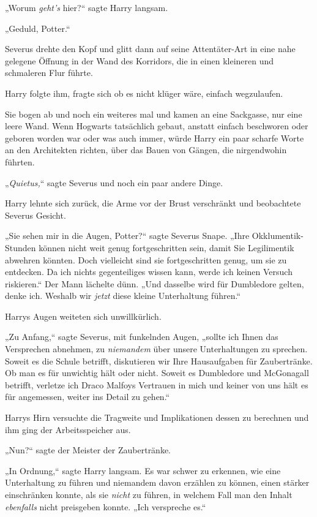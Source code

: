{„Worum \emph{geht's} hier?“ sagte Harry langsam.

„Geduld, Potter.“

Severus drehte den Kopf und glitt dann auf seine Attentäter-Art in eine nahe gelegene Öffnung in der Wand des Korridors, die in einen kleineren und schmaleren Flur führte.

Harry folgte ihm, fragte sich ob es nicht klüger wäre, einfach wegzulaufen.

Sie bogen ab und noch ein weiteres mal und kamen an eine Sackgasse, nur eine leere Wand. Wenn Hogwarts tatsächlich gebaut, anstatt einfach beschworen oder geboren worden war oder was auch immer, würde Harry ein paar scharfe Worte an den Architekten richten, über das Bauen von Gängen, die nirgendwohin führten.

„\emph{Quietus,}“ sagte Severus und noch ein paar andere Dinge.

Harry lehnte sich zurück, die Arme vor der Brust verschränkt und beobachtete Severus Gesicht.

„Sie sehen mir in die Augen, Potter?“ sagte Severus Snape. „Ihre Okklumentik-Stunden können nicht weit genug fortgeschritten sein, damit Sie Legilimentik abwehren könnten. Doch vielleicht sind sie fortgeschritten genug, um sie zu entdecken. Da ich nichts gegenteiliges wissen kann, werde ich keinen Versuch riskieren.“ Der Mann lächelte dünn. „Und dasselbe wird für Dumbledore gelten, denke ich. Weshalb wir \emph{jetzt} diese kleine Unterhaltung führen.“

Harrys Augen weiteten sich unwillkürlich.

„Zu Anfang,“ sagte Severus, mit funkelnden Augen, „sollte ich Ihnen das Versprechen abnehmen, zu \emph{niemandem} über unsere Unterhaltungen zu sprechen. Soweit es die Schule betrifft, diskutieren wir Ihre Hausaufgaben für Zaubertränke. Ob man es für unwichtig hält oder nicht. Soweit es Dumbledore und McGonagall betrifft, verletze ich Draco Malfoys Vertrauen in mich und keiner von uns hält es für angemessen, weiter ins Detail zu gehen.“

Harrys Hirn versuchte die Tragweite und Implikationen dessen zu berechnen und ihm ging der Arbeitsspeicher aus.

„Nun?“ sagte der Meister der Zaubertränke.

„In Ordnung,“ sagte Harry langsam. Es war schwer zu erkennen, wie eine Unterhaltung zu führen und niemandem davon erzählen zu können, einen stärker einschränken konnte, als sie \emph{nicht} zu führen, in welchem Fall man den Inhalt \emph{ebenfalls} nicht preisgeben konnte. „Ich verspreche es.“

}
